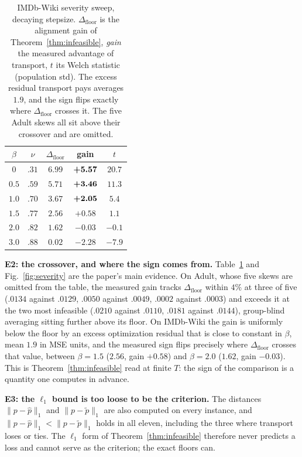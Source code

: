 \begin{table}[t]
\centering
\caption{IMDb-Wiki severity sweep, decaying stepsize. $\Delta_{\mathrm{floor}}$
is the alignment gain of Theorem~\ref{thm:infeasible}, \emph{gain} the measured
advantage of transport, $t$ its Welch statistic (population std). The excess
residual transport pays averages $1.9$, and the sign flips exactly where
$\Delta_{\mathrm{floor}}$ crosses it. The five Adult skews all sit above their
crossover and are omitted.}
\label{tab:severity}
\setlength{\tabcolsep}{3.0pt}
\begin{tabular}{ccccc}
\toprule
$\beta$ & $\nu$ & $\Delta_{\mathrm{floor}}$ & gain & $t$ \\
\midrule
$0$   & $.31$ & $6.99$ & $\textbf{+5.57}$ & $20.7$ \\
$0.5$ & $.59$ & $5.71$ & $\textbf{+3.46}$ & $11.3$ \\
$1.0$ & $.70$ & $3.67$ & $\textbf{+2.05}$ & $5.4$ \\
$1.5$ & $.77$ & $2.56$ & $+0.58$ & $1.1$ \\
$2.0$ & $.82$ & $1.62$ & $-0.03$ & $-0.1$ \\
$3.0$ & $.88$ & $0.02$ & $-2.28$ & $-7.9$ \\
\bottomrule
\end{tabular}
\end{table}

\noindent\textbf{E2: the crossover, and where the sign comes from.}
Table~\ref{tab:severity} and Fig.~\ref{fig:severity} are the paper's main
evidence. On Adult, whose five skews are omitted from the table, the measured gain tracks
$\Delta_{\mathrm{floor}}$ within $4\%$ at three of five
($.0134$ against $.0129$, $.0050$ against $.0049$, $.0002$ against $.0003$)
and exceeds it at the two most infeasible ($.0210$ against $.0110$, $.0181$
against $.0144$), group-blind averaging sitting further above its floor. On IMDb-Wiki the gain is
uniformly below the floor by an excess optimization residual that is close to
constant in $\beta$, mean $1.9$ in MSE units, and the measured sign flips
precisely where $\Delta_{\mathrm{floor}}$ crosses that value, between
$\beta{=}1.5$ ($2.56$, gain $+0.58$) and $\beta{=}2.0$ ($1.62$, gain $-0.03$).
This is Theorem~\ref{thm:infeasible} read at finite $T$: the sign of the
comparison is a quantity one computes in advance.

\noindent\textbf{E3: the $\ell_1$ bound is too loose to be the criterion.}
The distances $\|p-\hat p\|_1$ and $\|p-\tilde p\|_1$ are also computed on every
instance, and $\|p-\hat p\|_1<\|p-\tilde p\|_1$ holds in all eleven, including
the three where transport loses or ties. The $\ell_1$ form of
Theorem~\ref{thm:infeasible} therefore never predicts a loss and cannot serve as
the criterion; the exact floors can.

